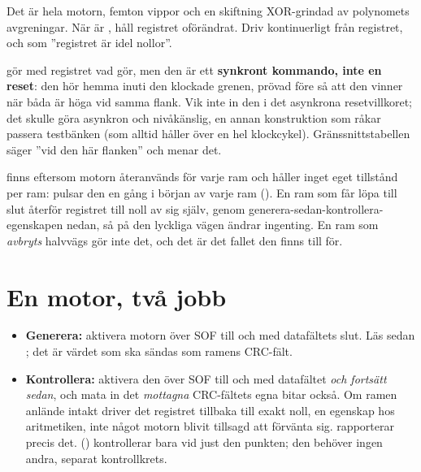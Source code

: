 Det är hela motorn, femton vippor och en skiftning XOR-grindad av polynomets avgreningar. När
 är , håll registret oförändrat. Driv  kontinuerligt från registret,
och  som ”registret är idel nollor”.

\begin{warning}
 gör med registret vad  gör, men den är ett \textbf{synkront kommando,
inte en reset}: den hör hemma inuti den klockade grenen, prövad före  så att den vinner
när båda är höga vid samma flank. Vik inte in den i det asynkrona resetvillkoret; det skulle göra
 asynkron och nivåkänslig, en annan konstruktion som råkar passera testbänken (som alltid
håller  över en hel klockcykel). Gränssnittstabellen säger ”vid den här flanken” och
menar det.
\end{warning}

 finns eftersom motorn återanvänds för varje ram och håller inget eget tillstånd per ram:
 pulsar den en gång i början av varje ram (). En ram som får
löpa till slut återför registret till noll av sig själv, genom
generera-sedan-kontrollera-egenskapen nedan, så på den lyckliga vägen ändrar  ingenting.
En ram som \emph{avbryts} halvvägs gör inte det, och det är det fallet den finns till för.

\section{En motor, två jobb}
\label{c13:sec:twojobs}

\begin{itemize}
  \item \textbf{Generera:} aktivera motorn över SOF till och med datafältets slut. Läs sedan
    ; det är värdet som ska sändas som ramens CRC-fält.
  \item \textbf{Kontrollera:} aktivera den över SOF till och med datafältet \emph{och fortsätt
    sedan}, och mata in det \emph{mottagna} CRC-fältets egna bitar också. Om ramen anlände intakt
    driver det registret tillbaka till exakt noll, en egenskap hos aritmetiken, inte något motorn
    blivit tillsagd att förvänta sig.  rapporterar precis det.
     () kontrollerar  bara vid just den punkten; den
    behöver ingen andra, separat kontrollkrets.
\end{itemize}

